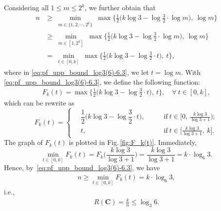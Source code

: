 \documentclass[11pt,draftclsnofoot,onecolumn]{IEEEtran}
\newcommand{\mbC}{\mathbf{C}}
\begin{document}
Considering all $1\leq m\leq 2^k$, we further obtain that
\begin{align}
  n&\geq\min_{\substack{m\in\{1,2,\cdots,2^k\}}}\max\Big\{\frac{1}{2}\Big(k\log3-\log\frac{3}{2}\cdot\log m\Big),~\log m\Big\}\nonumber\\
  &\geq\min_{\substack{m\in[1,2^k]}}\max\Big\{\frac{1}{2}\Big(k\log3-\log\frac{3}{2}\cdot\log m\Big),~\log m\Big\}\nonumber\\
  &=\min_{\substack{t\in[0,k]}}\max\Big\{\frac{1}{2}\Big(k\log3-\log\frac{3}{2}\cdot t\Big),~t\Big\},\label{eq:pf_upp_bound_log3(6)-6.3}
\end{align}
where in \eqref{eq:pf_upp_bound_log3(6)-6.3}, we let $t=\log m$. With \eqref{eq:pf_upp_bound_log3(6)-6.3}, we define the following function:
\begin{align}
F_{k}(t)=\max\Big\{\frac{1}{2}\Big(k\log3-\log\frac{3}{2}\cdot t\Big),~t\Big\},\quad \forall~t\in[0,k],\label{eq:pf_upp_bound_log3(6)-7}
\end{align}
which can be rewrite as
\begin{equation}
F_{k}(t)=\begin{cases}
\quad\dfrac{1}{2}\Big(k\log3-\log\dfrac{3}{2}\cdot t\Big),\qquad &\text{if}~ t\in\Big[0,~\frac{k\log3}{\log3+1}\Big);\\
\quad t,\qquad &\text{if}~ t\in\Big[\frac{k\log3}{\log3+1},~ k\Big].
\end{cases}\label{eq:pf_upp_bound_log3(6)-8}
\end{equation}
The graph of $F_{k}(t)$ is plotted in Fig.\,\ref{fig:F_k(t)}. Immediately,
\begin{equation}
\min_{t\in[0,k]}F_{k}(t)=F_{k}\Big(\frac{k\log3}{\log3+1}\Big)=\frac{k\log3}{\log3+1}=k\cdot\log_{6}3.
\label{eq:pf_upp_bound_log3(6)-9}
\end{equation}
Hence, by~\eqref{eq:pf_upp_bound_log3(6)-6.3}, we have
\begin{align}
n\geq\min_{t\in[0,k]}F_{k}(t)=k\cdot\log_{6}3,\nonumber
\end{align}
i.e.,
\begin{align}\label{equ1}
R(\mbC)=\frac{k}{n} \leq \log_{3}6.
\end{align}
\end{document}

